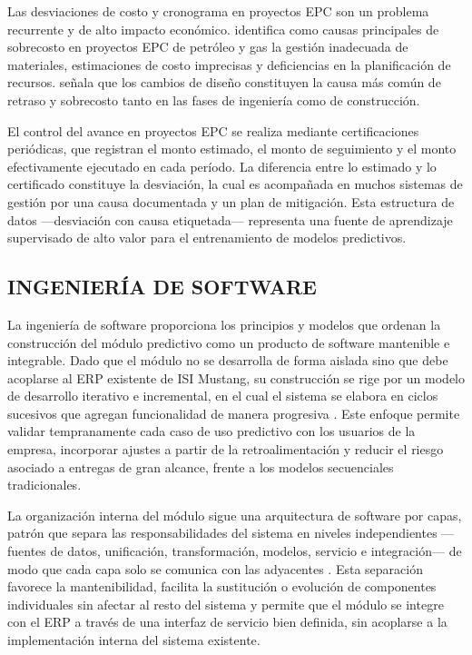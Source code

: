 \documentclass{univalle-perfil}
\begin{document}
Las desviaciones de costo y cronograma en proyectos EPC son un problema recurrente y de alto impacto económico. \textcite{CostOverrunsEPC2022} identifica como causas principales de sobrecosto en proyectos EPC de petróleo y gas la gestión inadecuada de materiales, estimaciones de costo imprecisas y deficiencias en la planificación de recursos. \textcite{EPCleadingIndicators2018} señala que los cambios de diseño constituyen la causa más común de retraso y sobrecosto tanto en las fases de ingeniería como de construcción.

El control del avance en proyectos EPC se realiza mediante certificaciones periódicas, que registran el monto estimado, el monto de seguimiento y el monto efectivamente ejecutado en cada período. La diferencia entre lo estimado y lo certificado constituye la desviación, la cual es acompañada en muchos sistemas de gestión por una causa documentada y un plan de mitigación. Esta estructura de datos —desviación con causa etiquetada— representa una fuente de aprendizaje supervisado de alto valor para el entrenamiento de modelos predictivos.

\subsection{INGENIERÍA DE SOFTWARE}

La ingeniería de software proporciona los principios y modelos que ordenan la construcción del módulo predictivo como un producto de software mantenible e integrable. Dado que el módulo no se desarrolla de forma aislada sino que debe acoplarse al ERP existente de ISI Mustang, su construcción se rige por un modelo de desarrollo iterativo e incremental, en el cual el sistema se elabora en ciclos sucesivos que agregan funcionalidad de manera progresiva \parencite{Sommerville2011}. Este enfoque permite validar tempranamente cada caso de uso predictivo con los usuarios de la empresa, incorporar ajustes a partir de la retroalimentación y reducir el riesgo asociado a entregas de gran alcance, frente a los modelos secuenciales tradicionales.

La organización interna del módulo sigue una arquitectura de software por capas, patrón que separa las responsabilidades del sistema en niveles independientes —fuentes de datos, unificación, transformación, modelos, servicio e integración— de modo que cada capa solo se comunica con las adyacentes \parencite{Bass2012}. Esta separación favorece la mantenibilidad, facilita la sustitución o evolución de componentes individuales sin afectar al resto del sistema y permite que el módulo se integre con el ERP a través de una interfaz de servicio bien definida, sin acoplarse a la implementación interna del sistema existente.
\end{document}
